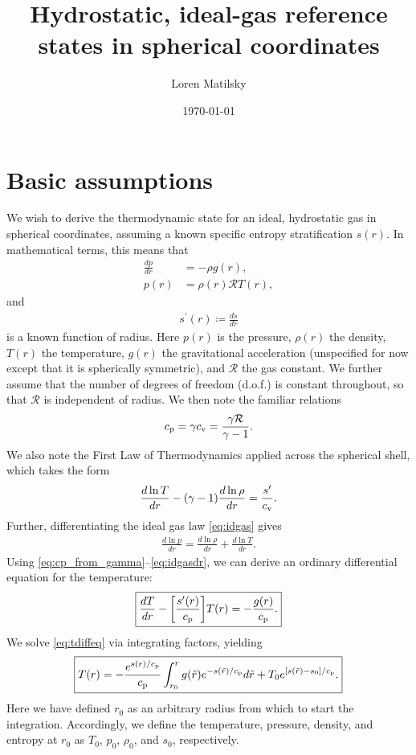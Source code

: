 \documentclass[12pt]{article} %
\date{\today}
\author{Loren Matilsky}
\title{Hydrostatic, ideal-gas reference states in spherical coordinates}
\newcommand{\cv}{c_{\rm{v}}}
\newcommand{\cp}{c_{\rm{p}}}
\begin{document}
	\maketitle
	\section{Basic assumptions}
	We wish to derive the thermodynamic state for an ideal, hydrostatic gas in spherical coordinates, assuming a known specific entropy stratification $s(r)$. In mathematical terms, this means that
	\begin{align}
	\frac{dp}{dr} &= -\rho g(r)\label{eq:hydr},\\
	p(r) &= \rho(r)\mathcal{R} T(r),\label{eq:idgas}
	\end{align}
	and 
	\begin{align}
	s^\prime(r) \coloneqq \frac{ds}{dr}
	\label{def:sgrad}
	\end{align}
	is a known function of radius. Here $p(r)$ is the pressure, $\rho(r)$ the density, $T(r)$ the temperature, $g(r)$ the gravitational acceleration (unspecified for now except that it is spherically symmetric), and $\mathcal{R}$ the gas constant. We further assume that the number of degrees of freedom (d.o.f.) is constant throughout, so that $\mathcal{R}$ is independent of radius. We then note the familiar relations
	\begin{align}
	\cp = \gamma\cv = \frac{\gamma\mathcal{R}}{\gamma - 1}\label{eq:cp_from_gamma}.
	\end{align}
	We also note the First Law of Thermodynamics applied across the spherical shell, which takes the form
	\begin{align}
	\frac{d\ln{T}}{dr} - (\gamma - 1)\frac{d\ln{\rho}}{dr} = \frac{s^\prime}{\cv}.
	\label{eq:firstlaw}
	\end{align}
	Further, differentiating the ideal gas law \eqref{eq:idgas} gives
	\begin{align}
	\frac{d\ln{p}}{dr} = \frac{d\ln{\rho}}{dr} + \frac{d\ln{T}}{dr}. 
	\label{eq:idgasdr}
	\end{align}
	Using \eqref{eq:cp_from_gamma}--\eqref{eq:idgasdr}, we can derive an ordinary differential equation for the temperature:
	\begin{align}
	\boxed{
	\frac{dT}{dr} - \bigg{[}\frac{s^\prime(r)}{\cp}\bigg{]}T(r) = -\frac{g(r)}{\cp}.
}
\label{eq:tdiffeq}
	\end{align}
	We solve \eqref{eq:tdiffeq} via integrating factors, yielding 
	\begin{align}
	\boxed{
	T(r) = -\frac{e^{s(r)/\cp}}{\cp}\int_{r_0}^r g(\tilde{r})e^{-s(\tilde{r})/\cp}d\tilde{r} + T_0e^{[s(\tilde{r})-s_0]/\cp}.
	\label{eq:tgeneral}}
	\end{align}
	Here we have defined $r_0$ as an arbitrary radius from which to start the integration. Accordingly, we define the temperature, pressure, density, and entropy at $r_0$ as $T_0$, $p_0$, $\rho_0$, and $s_0$, respectively.
	
\end{document}
